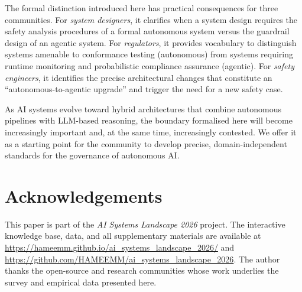 \documentclass[12pt, a4paper]{article}
\begin{document}
The formal distinction introduced here has practical consequences for three communities. For \emph{system designers}, it clarifies when a system design requires the safety analysis procedures of a formal autonomous system versus the guardrail design of an agentic system. For \emph{regulators}, it provides vocabulary to distinguish systems amenable to conformance testing (autonomous) from systems requiring runtime monitoring and probabilistic compliance assurance (agentic). For \emph{safety engineers}, it identifies the precise architectural changes that constitute an ``autonomous-to-agentic upgrade'' and trigger the need for a new safety case.

As AI systems evolve toward hybrid architectures that combine autonomous pipelines with LLM-based reasoning, the boundary formalised here will become increasingly important and, at the same time, increasingly contested. We offer it as a starting point for the community to develop precise, domain-independent standards for the governance of autonomous AI.

\section*{Acknowledgements}
This paper is part of the \emph{AI Systems Landscape 2026} project. The interactive knowledge base, data, and all supplementary materials are available at \url{https://hameemm.github.io/ai_systems_landscape_2026/} and \url{https://github.com/HAMEEMM/ai_systems_landscape_2026}. The author thanks the open-source and research communities whose work underlies the survey and empirical data presented here.


\end{document}

